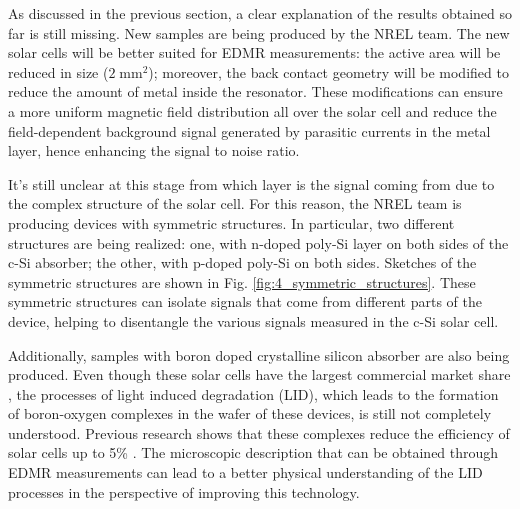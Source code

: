\documentclass[a4paper]{book}
\begin{document}
	As discussed in the previous section, a clear explanation of the results obtained so far is still missing. New samples are being produced by the NREL team. The new solar cells will be better suited for EDMR measurements: the active area will be reduced in size ($2 \; \text{mm}^2$); moreover, the back contact geometry will be modified to reduce the amount of metal inside the resonator. These modifications can ensure a more uniform magnetic field distribution all over the solar cell and reduce the field-dependent background signal generated by parasitic currents in the metal layer, hence enhancing the signal to noise ratio.
	
	It's still unclear at this stage from which layer is the signal coming from due to the complex structure of the solar cell. For this reason, the NREL team is producing devices with symmetric structures. In particular, two different structures are being realized: one, with n-doped poly-Si layer on both sides of the c-Si absorber; the other, with p-doped poly-Si on both sides. Sketches of the symmetric structures are shown in Fig. \ref{fig:4_symmetric_structures}. These symmetric structures can isolate signals that come from different parts of the device, helping to disentangle the various signals measured in the c-Si solar cell.
	
	Additionally, samples with boron doped crystalline silicon absorber are also being produced. Even though these solar cells have the largest commercial market share \cite{InternationalTechnologyRoadmap2021}, the processes of light induced degradation (LID), which leads to the formation of boron-oxygen complexes in the wafer of these devices, is still not completely understood. Previous research shows that these complexes reduce the efficiency of solar cells up to 5\% \cite{nieweltDegradationCrystallineSilicon2017}. The microscopic description that can be obtained through EDMR measurements can lead to a better physical understanding of the LID processes in the perspective of improving this technology.
	
\end{document}
